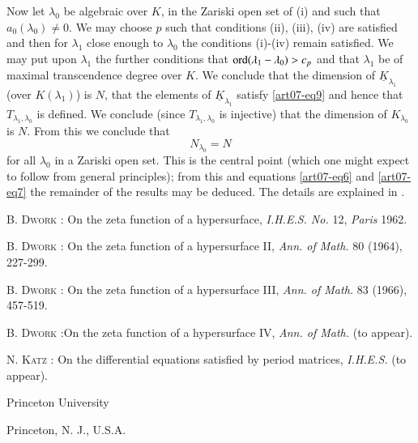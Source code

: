 Now let $\lambda_{0}$ be algebraic over $K$, in the Zariski open set of (i) and such that $a_{0}(\lambda_{0})\neq 0$. We may choose $p$ such that conditions (ii), (iii), (iv) are satisfied and then for $\lambda_{1}$ close enough to $\lambda_{0}$ the conditions (i)-(iv) remain satisfied. We may put upon $\lambda_{1}$ the further conditions that $\operatorname{\mathrm{ord}} (\lambda_{1}-\lambda_{0})>c_{p}$ and that $\lambda_{1}$ be of maximal transcendence degree over $K$. We conclude that the dimension of $\underline{K}_{\lambda_{1}}$ (over $K(\lambda_{1})$) is $N$, that the elements of $\underline{K}_{\lambda_{1}}$ satisfy \eqref{art07-eq9} and hence that $T_{\lambda_{1},\lambda_{0}}$ is defined. We conclude (since $T_{\lambda_{1},\lambda_{0}}$ is injective) that the dimension of $K_{\lambda_{0}}$ is $N$. From this we conclude that
$$
N_{\lambda_{0}}=N
$$
for all $\lambda_{0}$ in a Zariski open set. This is the central point (which one might expect to follow from general principles); from this and equations \eqref{art07-eq6} and \eqref{art07-eq7} the remainder of the results may be deduced. The details are explained in \cite{art07-key4}.

\begin{thebibliography}{99}
 \textsc{B. Dwork :} On the zeta function of a hypersurface, {\em I.H.E.S. No.} 12, {\em Paris} 1962.

 \textsc{B. Dwork :} On the zeta function of a hypersurface II, {\em Ann. of Math.} 80 (1964), 227-299.

 \textsc{B. Dwork :} On the zeta function of a hypersurface III, {\em Ann. of Math.} 83 (1966), 457-519.

 \textsc{B. Dwork :}\pageoriginale On the zeta function of a hypersurface IV, {\em Ann. of Math.} (to appear).

 \textsc{N. Katz :} On the differential equations satisfied by period matrices, {\em I.H.E.S.} (to appear).
\end{thebibliography}

\medskip
\noindent
{\small Princeton University}

\noindent
{\small Princeton, N. J., U.S.A.}
